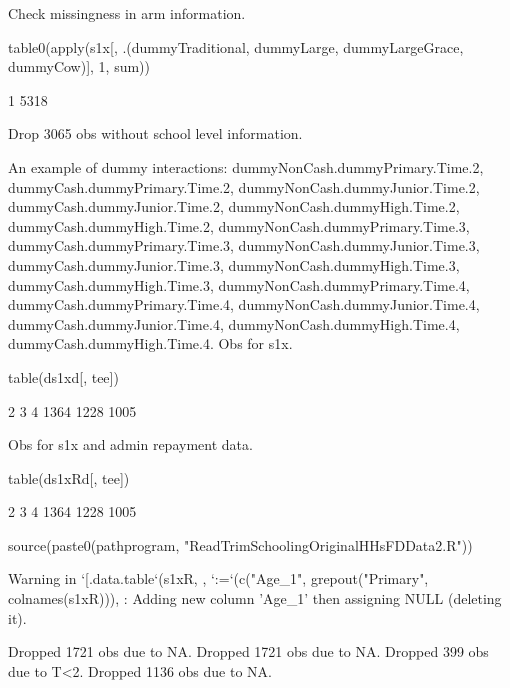 Check missingness in arm information.
\begin{Schunk}
\begin{Sinput}
table0(apply(s1x[, .(dummyTraditional, dummyLarge, dummyLargeGrace, dummyCow)], 1, sum))
\end{Sinput}
\begin{Soutput}
   1 
5318 
\end{Soutput}
\end{Schunk}
Drop 3065 obs without school level information.
\begin{Schunk}
\end{Schunk}
An example of dummy interactions: \textsf{\footnotesize dummyNonCash.dummyPrimary.Time.2, dummyCash.dummyPrimary.Time.2, dummyNonCash.dummyJunior.Time.2, dummyCash.dummyJunior.Time.2, dummyNonCash.dummyHigh.Time.2, dummyCash.dummyHigh.Time.2, dummyNonCash.dummyPrimary.Time.3, dummyCash.dummyPrimary.Time.3, dummyNonCash.dummyJunior.Time.3, dummyCash.dummyJunior.Time.3, dummyNonCash.dummyHigh.Time.3, dummyCash.dummyHigh.Time.3, dummyNonCash.dummyPrimary.Time.4, dummyCash.dummyPrimary.Time.4, dummyNonCash.dummyJunior.Time.4, dummyCash.dummyJunior.Time.4, dummyNonCash.dummyHigh.Time.4, dummyCash.dummyHigh.Time.4}.
Obs for \textsf{s1x}.
\begin{Schunk}
\begin{Sinput}
table(ds1xd[, tee])
\end{Sinput}
\begin{Soutput}

   2    3    4 
1364 1228 1005 
\end{Soutput}
\end{Schunk}
Obs for \textsf{s1x} and admin repayment data.
\begin{Schunk}
\begin{Sinput}
table(ds1xRd[, tee])
\end{Sinput}
\begin{Soutput}

   2    3    4 
1364 1228 1005 
\end{Soutput}
\end{Schunk}
\begin{Schunk}
\begin{Sinput}
source(paste0(pathprogram, "ReadTrimSchoolingOriginalHHsFDData2.R"))
\end{Sinput}
\begin{Soutput}
Warning in `[.data.table`(s1xR, , `:=`(c("Age_1", grepout("Primary", colnames(s1xR))), : Adding new column 'Age_1' then assigning NULL (deleting it).
\end{Soutput}
\begin{Soutput}
Dropped 1721 obs due to NA.
Dropped 1721 obs due to NA.
Dropped 399 obs due to T<2.
Dropped 1136 obs due to NA.
\end{Soutput}
\end{Schunk}

